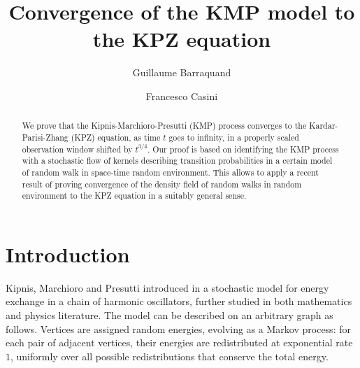\documentclass[a4paper,11pt,oneside,reqno]{amsart}
\theoremstyle{definition}
\numberwithin{equation}{section}
\begin{document}
	
	\title{Convergence of the KMP model to the KPZ equation}
	
	
	\author[G.~Barraquand]{Guillaume Barraquand}
	\address{G. Barraquand, Laboratoire de Physique de l'Ecole Normale Supérieure, Ecole Normale Supérieure, PSL University, CNRS, Sorbonne Université, Université Paris-Cité, 24 rue Lhomond, 75005 PARIS}
	
	\author[F.~Casini]{Francesco Casini}
	\address{F. Casini, Laboratoire de Physique de l'Ecole Normale Supérieure, Ecole Normale Supérieure, PSL University, CNRS, Sorbonne Université, Université Paris-Cité, 24 rue Lhomond, 75005 PARIS}
	


\begin{abstract}
We prove that the Kipnis-Marchioro-Presutti (KMP) process converges to the Kardar-Parisi-Zhang (KPZ) equation, as time $t$ goes to infinity, in a properly scaled observation window shifted by $t^{3/4}$. Our proof is based on identifying the KMP process with a stochastic flow of kernels  describing transition probabilities in a certain model of random walk in space-time random environment. This allows to apply a recent result of \cite{parekh2} proving convergence of the density field of random walks in random environment to the KPZ equation in a suitably general sense.
\end{abstract}




\maketitle

	\setcounter{tocdepth}{1}
	\tableofcontents

\section{Introduction}
Kipnis, Marchioro and Presutti introduced in \cite{kipnis1982heat} a stochastic model for energy exchange in a chain of harmonic oscillators, further studied in both mathematics and physics literature. The model can be described on an arbitrary graph as follows. Vertices are assigned random energies, evolving as a Markov process: for each pair of adjacent vertices, their energies are redistributed at exponential rate $1$, uniformly over all possible redistributions that conserve the total energy. 
\medskip 
\end{document}
